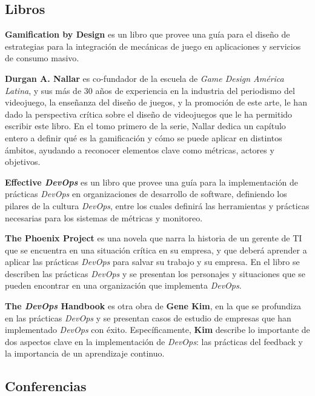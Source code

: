 \documentclass[journal]{IEEEtran}
\begin{document}
\subsection{\textbf{\large Libros}}

\cite{zichermann2011gamification} \textbf{Gamification by Design} es un libro que provee una guía para el diseño de estrategias para la integración de mecánicas de juego en aplicaciones y servicios de consumo masivo.

\cite{nallar2015estructuraludica} \textbf{Durgan A. Nallar} es co-fundador de la escuela de \textit{Game Design América Latina}, y sus más de 30 años de experiencia en la industria del periodismo del videojuego, la enseñanza del diseño de juegos, y la promoción de este arte, le han dado la perspectiva crítica sobre el diseño de videojuegos que le ha permitido escribir este libro. En el tomo primero de la serie, Nallar dedica un capítulo entero a definir qué es la gamificación y cómo se puede aplicar en distintos ámbitos, ayudando a reconocer elementos clave como métricas, actores y objetivos.

\cite{davis2016effective} \textbf{Effective \textit{DevOps}} es un libro que provee una guía para la implementación de prácticas \textit{DevOps} en organizaciones de desarrollo de software, definiendo los pilares de la cultura \textit{DevOps}, entre los cuales definirá las herramientas y prácticas necesarias para los sistemas de métricas y monitoreo.

\cite{kim2018phoenix} \textbf{The Phoenix Project} es una novela que narra la historia de un gerente de TI que se encuentra en una situación crítica en su empresa, y que deberá aprender a aplicar las prácticas \textit{DevOps} para salvar su trabajo y su empresa. En el libro se describen las prácticas \textit{DevOps} y se presentan los personajes y situaciones que se pueden encontrar en una organización que implementa \textit{DevOps}.

\cite{kim2021devops} \textbf{The \textit{DevOps} Handbook} es otra obra de \textbf{Gene Kim}, en la que se profundiza en las prácticas \textit{DevOps} y se presentan casos de estudio de empresas que han implementado \textit{DevOps} con éxito. Específicamente, \textbf{Kim} describe lo importante de dos aspectos clave en la implementación de \textit{DevOps}: las prácticas del feedback y la importancia de un aprendizaje continuo.

\subsection{\textbf{\large Conferencias}}
\end{document}
